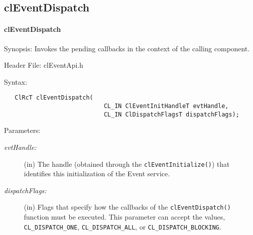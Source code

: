 \begin{flushleft}
\subsection{clEventDispatch}
\hypertarget{pageem118}{}\paragraph{cl\-Event\-Dispatch}\label{pageem118}
\begin{Desc}
\item[Synopsis:]Invokes the pending callbacks in the context of the calling component.
\end{Desc}
\begin{Desc}
\item[Header File:]clEventApi.h\end{Desc}
\begin{Desc}
\item[Syntax:]

\footnotesize\begin{verbatim}   ClRcT clEventDispatch(
              				CL_IN ClEventInitHandleT evtHandle,
			                CL_IN ClDispatchFlagsT dispatchFlags);
\end{verbatim}
\normalsize
\end{Desc}
\begin{Desc}
\item[Parameters:]
\begin{description}
\item[{\em evt\-Handle:}](in) The handle (obtained through the {\tt{clEventInitialize()}}) that identifies this initialization of the Event service.
\item[{\em dispatch\-Flags:}](in) Flags that specify how the callbacks of the {\tt{clEventDispatch()}} function must be executed. This parameter can 
accept the values, {\tt{CL\_\-DISPATCH\_\-ONE}}, {\tt{CL\_\-DISPATCH\_\-ALL}}, or {\tt{CL\_\-DISPATCH\_\-BLOCKING}}.


\end{description}
\end{Desc}
\end{flushleft}
